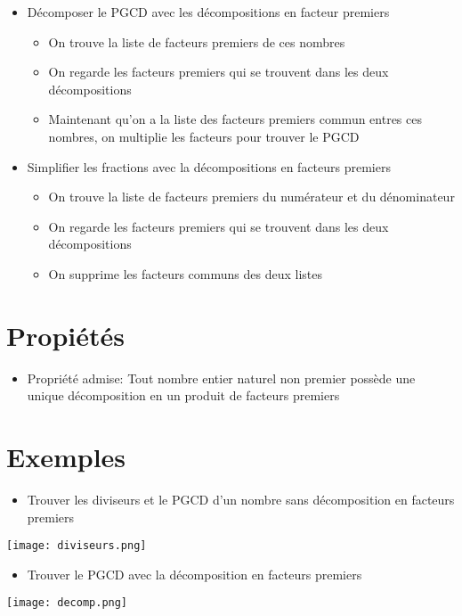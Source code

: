 \documentclass[14pt, letterpaper]{article}
\begin{document}
\begin{itemize}
  \item{D\'ecomposer le PGCD avec les d\'ecompositions en facteur premiers}
    \begin{itemize}
      \item{On trouve la liste de facteurs premiers de ces nombres}
      \item{On regarde les facteurs premiers qui se trouvent dans les deux
        d\'ecompositions}
        \item{Maintenant qu'on a la liste des facteurs premiers commun entres
        ces nombres, on multiplie les facteurs pour trouver le PGCD}
    \end{itemize}

  \item{Simplifier les fractions avec la d\'ecompositions en facteurs premiers}
    \begin{itemize}
      \item{On trouve la liste de facteurs premiers du num\'erateur et du d\'enominateur}
      \item{On regarde les facteurs premiers qui se trouvent dans les deux
        d\'ecompositions}
        \item{On supprime les facteurs communs des deux listes}
    \end{itemize}

\end{itemize}
\section{Propi\'et\'es}
\begin{itemize}
    \item{Propri\'et\'e admise: Tout nombre entier naturel non premier poss\`ede
    une unique d\'ecomposition en un produit de facteurs premiers}
\end{itemize}
\newpage
\section{Exemples}

\begin{itemize}
\item{Trouver les diviseurs et le PGCD d'un nombre sans d\'ecomposition en
    facteurs premiers}
\end{itemize}
\begin{center}
\texttt{[image: diviseurs.png]}
\begin{itemize}
\item{Trouver le PGCD avec la d\'ecomposition en facteurs premiers}
\end{itemize}

\texttt{[image: decomp.png]}

\end{center}
\end{document}
